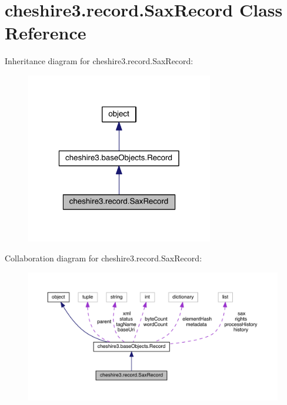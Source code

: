 \hypertarget{classcheshire3_1_1record_1_1_sax_record}{\section{cheshire3.\-record.\-Sax\-Record Class Reference}
\label{classcheshire3_1_1record_1_1_sax_record}
}


Inheritance diagram for cheshire3.\-record.\-Sax\-Record\-:
\nopagebreak
\begin{figure}[H]
\begin{center}
\leavevmode
\includegraphics[width=232pt]{classcheshire3_1_1record_1_1_sax_record__inherit__graph}
\end{center}
\end{figure}


Collaboration diagram for cheshire3.\-record.\-Sax\-Record\-:
\nopagebreak
\begin{figure}[H]
\begin{center}
\leavevmode
\includegraphics[width=350pt]{classcheshire3_1_1record_1_1_sax_record__coll__graph}
\end{center}
\end{figure}
